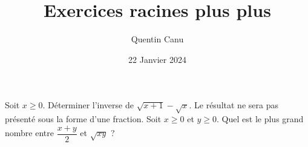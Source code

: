 \documentclass{exam}
\title{Exercices racines plus plus}
\date{22 Janvier 2024}
\author{Quentin Canu}
\begin{document}
\begin{questions}
\question Soit $x \geq 0$. Déterminer l'inverse de $\sqrt{x + 1} - \sqrt{x}$. Le résultat ne sera pas présenté sous la forme d'une fraction.
\vspace*{0.5cm}
\question Soit $x \geq 0$ et $y \geq 0$. Quel est le plus grand nombre entre $\dfrac{x + y}{2}$ et $\sqrt{xy}$ ?
\end{questions}
\end{document}

